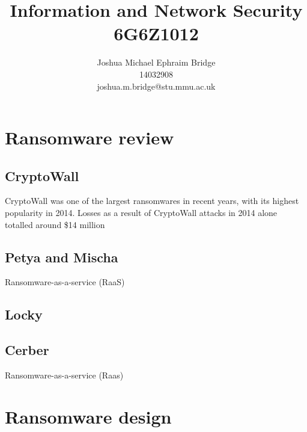 \documentclass[12pt]{article}
\title{\vspace{3cm}\textbf{Information and Network Security}\\6G6Z1012}
\author{Joshua Michael Ephraim Bridge\\14032908\\joshua.m.bridge@stu.mmu.ac.uk}
\begin{document}
\maketitle

\tableofcontents


\newpage

\section{Ransomware review}
  \subsection{CryptoWall}
    CryptoWall was one of the largest ransomwares in recent years, with its highest popularity in 2014. Losses as a result of CryptoWall attacks in 2014 alone totalled around \$14 million \citep{fbi2014cryptowall}
  \subsection{Petya and Mischa}
    Ransomware-as-a-service (RaaS)

  \subsection{Locky}

  \subsection{Cerber}
    Ransomware-as-a-service (Raas)

\newpage

\section{Ransomware design}

\newpage



\end{document}
